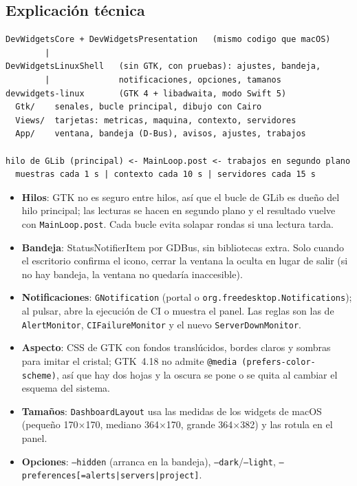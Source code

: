 \documentclass[11pt,a4paper]{article}
\begin{document}
\subsection{Explicación técnica}
\begin{lstlisting}
DevWidgetsCore + DevWidgetsPresentation   (mismo codigo que macOS)
        |
DevWidgetsLinuxShell   (sin GTK, con pruebas): ajustes, bandeja,
        |              notificaciones, opciones, tamanos
devwidgets-linux       (GTK 4 + libadwaita, modo Swift 5)
  Gtk/    senales, bucle principal, dibujo con Cairo
  Views/  tarjetas: metricas, maquina, contexto, servidores
  App/    ventana, bandeja (D-Bus), avisos, ajustes, trabajos

hilo de GLib (principal) <- MainLoop.post <- trabajos en segundo plano
  muestras cada 1 s | contexto cada 10 s | servidores cada 15 s
\end{lstlisting}
\begin{itemize}
  \item \textbf{Hilos}: GTK no es seguro entre hilos, así que el
    bucle de GLib es dueño del hilo principal; las lecturas se hacen
    en segundo plano y el resultado vuelve con \texttt{MainLoop.post}.
    Cada bucle evita solapar rondas si una lectura tarda.
  \item \textbf{Bandeja}: StatusNotifierItem por GDBus, sin
    bibliotecas extra. Solo cuando el escritorio confirma el icono,
    cerrar la ventana la oculta en lugar de salir (si no hay bandeja,
    la ventana no quedaría inaccesible).
  \item \textbf{Notificaciones}: \texttt{GNotification} (portal o
    \texttt{org.freedesktop.Notifications}); al pulsar, abre la
    ejecución de CI o muestra el panel. Las reglas son las de
    \texttt{AlertMonitor}, \texttt{CIFailureMonitor} y el nuevo
    \texttt{ServerDownMonitor}.
  \item \textbf{Aspecto}: CSS de GTK con fondos translúcidos, bordes
    claros y sombras para imitar el cristal; GTK~4.18 no admite
    \texttt{@media (prefers-color-scheme)}, así que hay dos hojas y la
    oscura se pone o se quita al cambiar el esquema del sistema.
  \item \textbf{Tamaños}: \texttt{DashboardLayout} usa las medidas de
    los widgets de macOS (pequeño 170$\times$170, mediano
    364$\times$170, grande 364$\times$382) y las rotula en el panel.
  \item \textbf{Opciones}: \texttt{--hidden} (arranca en la bandeja),
    \texttt{--dark}/\texttt{--light}, \texttt{--preferences[=alerts|servers|project]}.
\end{itemize}
\end{document}
